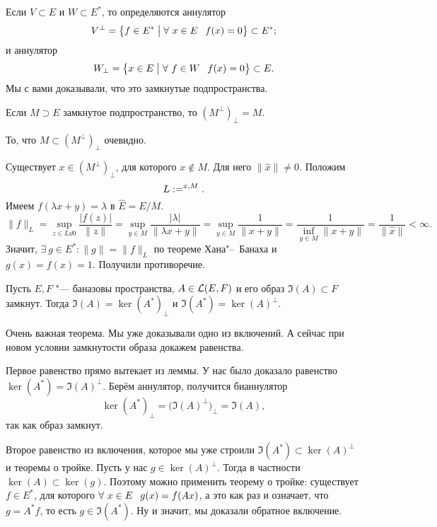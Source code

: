 Если $V\subset E$ и $W\subset E^*$, то определяются аннулятор 
\[
V^\perp = \big\{f\in E^*\bigm| \forall\ x\in E\hskip .75em plus.1em minus.08em\relax f(x)=0\big\}\subset E^*;
\]
и аннулятор
\[
  W_\perp = \big\{x\in E\bigm| \forall\ f\in W\pau f(x)=0\big\}\subset E.
\]
Мы с вами доказывали, что это замкнутые подпространства.

\begin{Lem}[о бианнуляторе]
  Если $M\supset E$ замкнутое подпространство, то $(M^\perp)_\perp = M$. 
\end{Lem}
\begin{Proof}
  То, что $M\subset (M^\perp)_\perp$ очевидно.

Существует $x\in (M^\perp)_\perp$, для которого $x\not\in M$. Для него $\|\hat x\|\ne0$. Положим
\[
  L:=\sp{x,M}.
\]
Имеем $f(\lambda x + y) = \lambda$ в $\hat E = E/M$.
\[
  \|f\|_L = \sup\limits_{z\in L\dd 0}\frac{\big|f(z)\big|}{\|z\|} =
  \sup\limits_{y\in M}\frac{|\lambda|}{\|\lambda x + y\|} = 
  \sup\limits_{y\in M}\frac1{\|x+y\|} = 
  \frac1{\inf\limits_{y\in M}\|x+y\|} = \frac1{\|\hat x\|}<\infty.
\]
Значит, $\exists\ g\in E^*\colon \|g\| = \|f\|_L$ по теореме Хана"--~Банаха и $g(x) = f(x) = 1$. Получили противоречие.
\end{Proof}
\begin{The}
  Пусть $E,F$ "--- баназовы пространства, $A\in\mathcal L(E,F)$ и его образ $\Im(A)\subset F$ замкнут. Тогда $\Im(A) = \ker(A^*)_\perp$ и $\Im(A^*) = \ker(A)^\perp$.
\end{The}
Очень важная теорема. Мы уже доказывали одно из включений. А сейчас при новом условии замкнутости образа докажем равенства.
\begin{Proof}
  Первое равенство прямо вытекает из леммы. У нас было доказало равенство $\ker(A^*) = \Im(A)^\perp$. Берём аннулятор, получится бианнулятор
\[
  \ker(A^*)_\perp = \big(\Im(A)^\perp\big)_\perp = \Im(A),
\]
так как образ замкнут.

Второе равенство из включения, которое мы уже строили $\Im(A^*)\subset \ker(A)^\perp$ и теоремы о тройке. Пусть у нас $g\in \ker(A)^\perp$. Тогда в частности $\ker(A)\subset \ker(g)$. Поэтому можно применить теорему о тройке: существует $f\in E^*$, для которого $\forall\ x\in E\pau g(x) = f(Ax)$, а это как раз и означает, что $g = A^*f$, то есть $g\in \Im(A^*)$. Ну и значит, мы доказали обратное включение.
\end{Proof}

